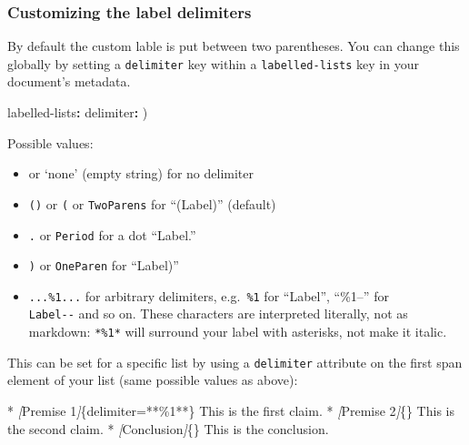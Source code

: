 \documentclass[
]{article}
\newenvironment{Shaded}{}{}
\newcommand{\AttributeTok}[1]{\textcolor[rgb]{0.49,0.56,0.16}{#1}}
\newcommand{\CommentTok}[1]{\textcolor[rgb]{0.38,0.63,0.69}{\textit{#1}}}
\newcommand{\FunctionTok}[1]{\textcolor[rgb]{0.02,0.16,0.49}{#1}}
\newcommand{\KeywordTok}[1]{\textcolor[rgb]{0.00,0.44,0.13}{\textbf{#1}}}
\newcommand{\NormalTok}[1]{#1}
\newcommand{\OtherTok}[1]{\textcolor[rgb]{0.00,0.44,0.13}{#1}}
\newcommand{\SpecialStringTok}[1]{\textcolor[rgb]{0.73,0.40,0.53}{#1}}
\providecommand{\tightlist}{%
  \setlength{\itemsep}{0pt}\setlength{\parskip}{0pt}}
\begin{document}
\hypertarget{customizing-the-label-delimiters}{%
\subsubsection{Customizing the label
delimiters}\label{customizing-the-label-delimiters}}

By default the custom lable is put between two parentheses. You can
change this globally by setting a \texttt{delimiter} key within a
\texttt{labelled-lists} key in your document's metadata.

\begin{Shaded}
\begin{Highlighting}[]
\FunctionTok{labelled{-}lists}\KeywordTok{:}
\AttributeTok{  }\FunctionTok{delimiter}\KeywordTok{:}\AttributeTok{ )}
\end{Highlighting}
\end{Shaded}

Possible values:

\begin{itemize}
\tightlist
\item
  \texttt{\textquotesingle{}\textquotesingle{}} or `none' (empty string)
  for no delimiter
\item
  \texttt{()} or \texttt{(} or \texttt{TwoParens} for ``(Label)''
  (default)
\item
  \texttt{.} or \texttt{Period} for a dot ``Label.''
\item
  \texttt{)} or \texttt{OneParen} for ``Label)''
\item
  \texttt{...\%1...} for arbitrary delimiters,
  e.g.~\texttt{\textbar{}\%1\textbar{}} for
  ``\textbar Label\textbar{}'', ``\%1--'' for\\
  \texttt{Label-\/-} and so on. These characters are interpreted
  literally, not as markdown: \texttt{*\%1*} will surround your label
  with asterisks, not make it italic.
\end{itemize}

This can be set for a specific list by using a \texttt{delimiter}
attribute on the first span element of your list (same possible values
as above):

\begin{Shaded}
\begin{Highlighting}[]
\SpecialStringTok{* }\CommentTok{[}\OtherTok{Premise 1}\CommentTok{]}\NormalTok{\{delimiter=\textquotesingle{}**\%1**\textquotesingle{}\} This is the first claim.}
\SpecialStringTok{* }\CommentTok{[}\OtherTok{Premise 2}\CommentTok{]}\NormalTok{\{\} This is the second claim.}
\SpecialStringTok{* }\CommentTok{[}\OtherTok{Conclusion}\CommentTok{]}\NormalTok{\{\} This is the conclusion.}
\end{Highlighting}
\end{Shaded}
\end{document}
